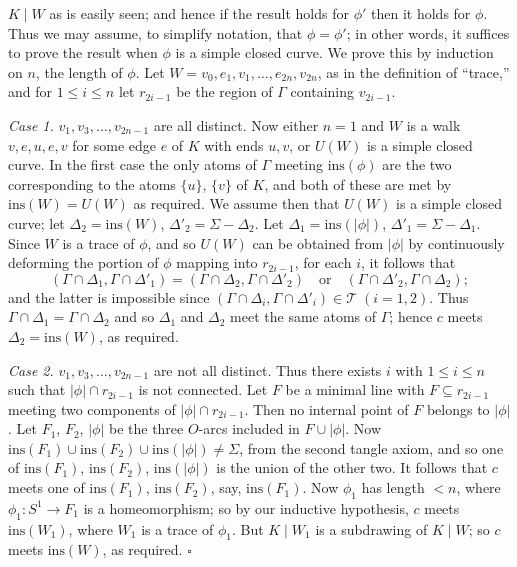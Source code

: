 \noindent $K \mid W$ as is easily seen; and hence if the result holds for $\phi'$ then it holds for $\phi$. Thus we may assume, to simplify notation, that $\phi = \phi'$; in other words, it suffices to prove the result when $\phi$ is a simple closed curve. We prove this by induction on $n$, the length of $\phi$. Let $W = v_0, e_1, v_1, \dots, e_{2n}, v_{2n}$, as in the definition of ``trace,'' and for $1 \le i \le n$ let $r_{2i-1}$ be the region of $\Gamma$ containing $v_{2i-1}$.

\textit{Case 1.} $v_1, v_3, \dots, v_{2n-1}$ are all distinct. Now either $n = 1$ and $W$ is a walk $v, e, u, e, v$ for some edge $e$ of $K$ with ends $u, v$, or $U(W)$ is a simple closed curve. In the first case the only atoms of $\Gamma$ meeting $\text{ins}(\phi)$ are the two corresponding to the atoms $\{u\}$, $\{v\}$ of $K$, and both of these are met by $\text{ins}(W) = U(W)$ as required. We assume then that $U(W)$ is a simple closed curve; let $\Delta_2 = \text{ins}(W)$, $\Delta'_2 = \Sigma - \Delta_2$. Let $\Delta_1 = \text{ins}(|\phi|)$, $\Delta'_1 = \Sigma - \Delta_1$. Since $W$ is a trace of $\phi$, and so $U(W)$ can be obtained from $|\phi|$ by continuously deforming the portion of $\phi$ mapping into $r_{2i-1}$, for each $i$, it follows that
\begin{equation*}
(\Gamma \cap \Delta_1, \Gamma \cap \Delta'_1) = (\Gamma \cap \Delta_2, \Gamma \cap \Delta'_2) \quad \text{or} \quad (\Gamma \cap \Delta'_2, \Gamma \cap \Delta_2);
\end{equation*}
and the latter is impossible since $(\Gamma \cap \Delta_i, \Gamma \cap \Delta'_i) \in \mathscr{T} \; (i = 1, 2)$. Thus $\Gamma \cap \Delta_1 = \Gamma \cap \Delta_2$ and so $\Delta_1$ and $\Delta_2$ meet the same atoms of $\Gamma$; hence $c$ meets $\Delta_2 = \text{ins}(W)$, as required.

\textit{Case 2.} $v_1, v_3, \dots, v_{2n-1}$ are not all distinct. Thus there exists $i$ with $1 \le i \le n$ such that $|\phi| \cap r_{2i-1}$ is not connected. Let $F$ be a minimal line with $F \subseteq r_{2i-1}$ meeting two components of $|\phi| \cap r_{2i-1}$. Then no internal point of $F$ belongs to $|\phi|$. Let $F_1$, $F_2$, $|\phi|$ be the three $O$-arcs included in $F \cup |\phi|$. Now $\text{ins}(F_1) \cup \text{ins}(F_2) \cup \text{ins}(|\phi|) \ne \Sigma$, from the second tangle axiom, and so one of $\text{ins}(F_1)$, $\text{ins}(F_2)$, $\text{ins}(|\phi|)$ is the union of the other two. It follows that $c$ meets one of $\text{ins}(F_1)$, $\text{ins}(F_2)$, say, $\text{ins}(F_1)$. Now $\phi_1$ has length $< n$, where $\phi_1 \colon S^1 \to F_1$ is a homeomorphism; so by our inductive hypothesis, $c$ meets $\text{ins}(W_1)$, where $W_1$ is a trace of $\phi_1$. But $K \mid W_1$ is a subdrawing of $K \mid W$; so $c$ meets $\text{ins}(W)$, as required. $\square$

